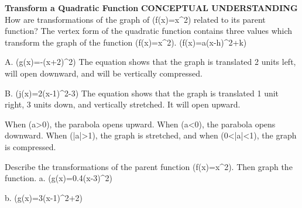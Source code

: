 \documentclass{article}
\newenvironment{example}[1]{}{}         %
\newenvironment{tryit}[1]{}{}           %
\newcommand{\answer}[1]{}               %
\newcommand{\placeholder}[2]{}          %
\newcommand{\te}[1]{}                   %
\begin{document}
\begin{example}{1}
\textbf{Transform a Quadratic Function}
\textbf{CONCEPTUAL UNDERSTANDING}
How are transformations of the graph of (f(x)=x^2) related to its parent function?
The vertex form of the quadratic function contains three values which transform the graph of the function (f(x)=x^2).
(f(x)=a(x-h)^2+k)
\te{Callouts: The value of (a) determines the direction the parabola opens and whether the graph is stretched or compressed. The value of (h) determines the horizontal translation. The value of (k) determines the vertical translation.}
A. (g(x)=-(x+2)^2)
The equation shows that the graph is translated 2 units left, will open downward, and will be vertically compressed.
\placeholder{graph}{Example 1A: blue f(x)=x^2 with vertex (0,0) and red g(x)=-0.5(x+2)^2 with vertex (-2,0), labeled f and g; arrows on all branches. Gray x,y axes with arrowheads; unit grid, window [-5,5] by [-5,5]; labels -4,-2,2,4 on each axis and O at origin.}
\answer{Translated 2 units left, will open downward, and will be vertically compressed.}
B. (j(x)=2(x-1)^2-3)
The equation shows that the graph is translated 1 unit right, 3 units down, and vertically stretched. It will open upward.
\placeholder{graph}{Example 1B: blue f(x)=x^2, vertex (0,0), red j(x)=2(x-1)^2-3, vertex (1,-3), labeled f and j, arrows on both ends of each parabola. Gray x,y axes; unit grid, window [-5,5] by [-5,5]; labels -4,-2,2,4 and O at origin.}
\answer{Translated 1 unit right, 3 units down, and vertically stretched. It will open upward.}
When (a>0), the parabola opens upward. When (a<0), the parabola opens downward. When (|a|>1), the graph is stretched, and when (0<|a|<1), the graph is compressed.
\te{STUDY TIP Recall that a vertical stretch makes the graph narrower and that a vertical compression makes the graph wider. To see the effects easily, use the same axes or units for all graphs.}
\end{example}
\begin{tryit}{1}
Describe the transformations of the parent function (f(x)=x^2). Then graph the function.
a. (g(x)=0.4(x-3)^2)
\answer{a. The equation shows that the graph is vertically compressed, translated 3 units to the right, and will open upward.}
\placeholder{graph}{Try It 1a answer: blue upward parabola g(x)=0.4(x-3)^2, vertex (3,0), y-intercept (0,3.6), arrows at both ends; gray x,y axes with arrowheads, unit grid, window [-5,5] by [-5,5], tick labels -4,-2,2,4, origin O.}
b. (g(x)=3(x-1)^2+2)
\answer{b. The equation shows that the graph is vertically stretched, translated to the right 1 unit and up 2 units, and will open upward.}
\placeholder{graph}{Try It 1b answer: blue upward parabola g(x)=3(x-1)^2+2, vertex (1,2), y-intercept (0,5), arrows both ends; gray x,y axes with arrowheads, unit grid, window [-5,5] by [-5,5], labels -4,-2,2,4, origin O.}
\end{tryit}
\end{document}
